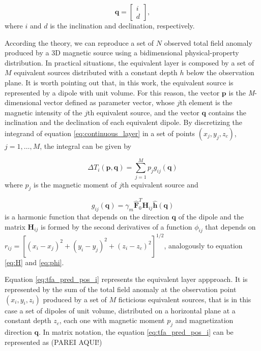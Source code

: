  \begin{equation}
   \mathbf{q} =
   \left[ \begin{array}{c}
   i  \\ 
   d     
   \end{array} \right] ,
   \label{eq:q_vector}
 \end{equation}
 where $i$ and $d$ is the inclination and declination, respectively.


According the theory, we can reproduce a set of $N$ observed total field anomaly produced by a 3D magnetic source using a bidimensional physical-property distribution. In practical situations, the equivalent layer is composed by a set of $M$ equivalent sources distributed with a constant depth $h$ below the observation plane. It is worth pointing out that, in this work, the equivalent source is represented by a dipole with unit volume. For this reason, the vector $\mathbf{p}$ is the \textit{M}-dimensional vector defined as parameter vector, whose $j$th element is the magnetic intensity of the $j$th equivalent source, and the vector $\mathbf{q}$ contains the inclination and the declination of each equivalent dipole. By discretizing the integrand of equation \ref{eq:continuous_layer} in a set of points $(x_j,y_j,z_c)$, $j = 1, \ldots, M$, the integral can be given by

\begin{equation}
\Delta T_i (\mathbf{p},\mathbf{q})   = \sum_{j=1}^{M} p_j g_{ij} (\mathbf{q})
\label{eq:tfa_pred_pos_i}
\end{equation}    
where $p_j$ is the magnetic moment of $j$th equivalent source and 

\begin{equation}
g_{ij} (\mathbf{q})  = \gamma_m \hat{\mathbf{F}}_0^T \mathbf{H}_{ij} \hat{\mathbf{h}}(\mathbf{q})
\label{eq:g_ij}
\end{equation}
is a harmonic function that depends on the direction $\mathbf{q}$ of the dipole and the matrix $\mathbf{H}_{ij}$ is formed by the second derivatives of a function $\phi_{ij}$ that depends on $r_{ij} = [(x_i-x_j)^2 + (y_i-y_j)^2 + (z_i-z_c)^2]^{1/2}$, analogously to equation \ref{eq:H} and \ref{eq:phi}.

Equation \ref{eq:tfa_pred_pos_i} represents the equivalent layer appproach. It is represented by the sum of the total field anomaly at the observation point $(x_i,y_i,z_i)$ produced by a set of $M$ ficticious equivalent sources, that is in this case a set of dipoles of unit volume, distributed on a horizontal plane at a constant depth $z_c$, each one with magnetic moment $p_j$ and magnetization direction $\mathbf{q}$. In matrix notation, the equation \ref{eq:tfa_pred_pos_i} can be represented as (PAREI AQUI!)


